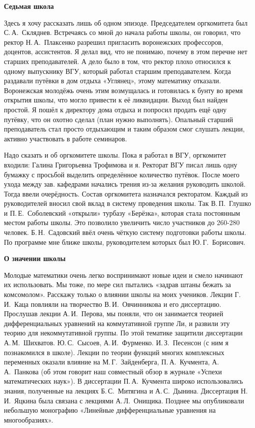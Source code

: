 {\bf Седьмая школа}

Здесь я хочу рассказать лишь об одном эпизоде.
Председателем оргкомитета был С.\,А.~Скляднев.
Встречаясь со мной до начала работы школы, он говорил,
что ректор
\linebreak
Н.\,А.~Плаксенко разрешил пригласить воронежских профессоров, доцентов, ассистентов.
Я делал вид, что не понимаю, почему в этом перечне нет старших преподавателей. А дело было в том, что ректор плохо относился к одному выпускнику ВГУ, который работал старшим преподавателем. Когда раздавали путёвки в дом отдыха «Углянец», этому математику отказали. Воронежская молодёжь очень этим возмущалась и готовилась к бунту во время открытия школы, что могло привести к её ликвидации. Выход был найден простой. Я пошёл к директору дома отдыха и попросил продать ещё одну путёвку, что он охотно сделал (план нужно выполнять). Опальный старший преподаватель стал просто отдыхающим и таким образом смог слушать лекции, активно участвовать в работе семинаров.

Надо сказать и об оргкомитете школы. Пока я работал в ВГУ, оргкомитет входили: Галина Григорьевна Трофимова и я. Ректорат ВГУ писал лишь одну бумажку с просьбой выделить определённое количество путёвок. После моего ухода между зав. кафедрами начались трения из-за желания руководить школой. Тогда ввели очерёдность. Состав оргкомитета назначался ректоратом. Каждый из руководителей вносил свой вклад в систему проведения школы. Так В.\,П.~Глушко и П.\,Е.~Соболевский «открыли» турбазу «Берёзка», которая стала постоянным местом работы школы. Это позволило увеличить число участников до 260-280 человек. Б.\,Н.~Садовский ввёл очень чёткую систему подготовки работы школы. По программе мне ближе школы, руководителем которых был Ю.\,Г.~Борисович.

{\bf О значении школы}

Молодые математики очень легко воспринимают новые идеи и смело начинают их использовать.
Мы тоже, по мере сил пытались «задрав штаны бежать за комсомолом». Расскажу только о влиянии школы на моих учеников.
Лекции Г.\,И.~Каца повлияли на творчество В.\,И.~Овчинникова и его диссертацию.
Прослушав лекции А.\,И.~Перова, мы поняли, что он занимается теорией дифференциальных уравнений на коммутативной группе Ли,
и развили эту теорию для некоммутативной группы.
По этой тематике защитили диссертации А.\,М.~Шихватов. Ю.\,С.~Сысоев, А.\,И.~Фурменко. И.\,З.~Песенсон (с ним я познакомился в школе).
Лекции по теории функций многих комплексных переменных оказали влияние на М.\,Г.~Зайденберга, П.\,А.~Кучмента, А.\,А.~Панкова
(об этом говорит наш совместный обзор в журнале «Успехи математических наук»).
В диссертации П.\,А.~Кучмента широко использовались знания, полученные на лекциях Б.\,С.~Ми\-тя\-ги\-на и А.\,С.~Дынина. Диссертация Н.\,И.~Яцкина была связана с лекциями А.\,Л.~Онищика. Позднее мы опубликовали небольшую монографию «Линейные дифференциальные уравнения на многообразиях».

